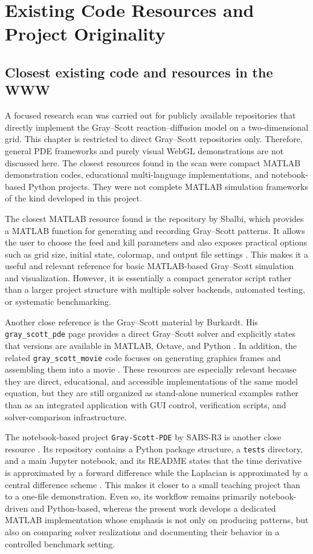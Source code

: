 \chapter{Existing Code Resources and Project Originality}

\section{Closest existing code and resources in the WWW}

A focused research scan was carried out for publicly available repositories that directly implement the Gray--Scott reaction--diffusion model on a two-dimensional grid. This chapter is restricted to direct Gray--Scott repositories only. Therefore, general PDE frameworks and purely visual WebGL demonstrations are not discussed here. The closest resources found in the scan were compact MATLAB demonstration codes, educational multi-language implementations, and notebook-based Python projects. They were not complete MATLAB simulation frameworks of the kind developed in this project.

The closest MATLAB resource found is the repository by Sbalbi, which provides a MATLAB function for generating and recording Gray--Scott patterns. It allows the user to choose the feed and kill parameters and also exposes practical options such as grid size, initial state, colormap, and output file settings \cite{sbalbi_gray_scott}. This makes it a useful and relevant reference for basic MATLAB-based Gray--Scott simulation and visualization. However, it is essentially a compact generator script rather than a larger project structure with multiple solver backends, automated testing, or systematic benchmarking.

Another close reference is the Gray--Scott material by Burkardt. His \texttt{gray\_scott\_pde} page provides a direct Gray--Scott solver and explicitly states that versions are available in MATLAB, Octave, and Python \cite{burkardt_gray_scott_pde}. In addition, the related \texttt{gray\_scott\_movie} code focuses on generating graphics frames and assembling them into a movie \cite{burkardt_gray_scott_movie}. These resources are especially relevant because they are direct, educational, and accessible implementations of the same model equation, but they are still organized as stand-alone numerical examples rather than as an integrated application with GUI control, verification scripts, and solver-comparison infrastructure.

The notebook-based project \texttt{Gray-Scott-PDE} by SABS-R3 is another close resource \cite{sabs_gray_scott}. Its repository contains a Python package structure, a \texttt{tests} directory, and a main Jupyter notebook, and its README states that the time derivative is approximated by a forward difference while the Laplacian is approximated by a central difference scheme \cite{sabs_gray_scott}. This makes it closer to a small teaching project than to a one-file demonstration. Even so, its workflow remains primarily notebook-driven and Python-based, whereas the present work develops a dedicated MATLAB implementation whose emphasis is not only on producing patterns, but also on comparing solver realizations and documenting their behavior in a controlled benchmark setting.

